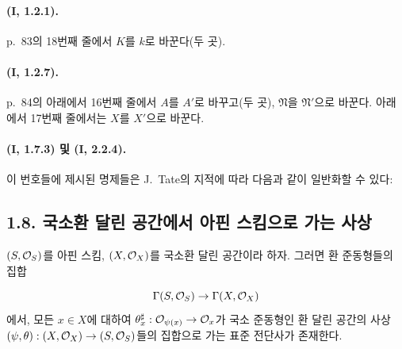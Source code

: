 \paragraph{(I, 1.2.1).}
p.~83의 18번째 줄에서 $K$를 $k$로 바꾼다(두 곳).

\paragraph{(I, 1.2.7).}
p.~84의 아래에서 16번째 줄에서 $A$를 $A'$로 바꾸고(두 곳),
$\mathfrak N$을 $\mathfrak N'$으로 바꾼다. 아래에서 17번째 줄에서는
$X$를 $X'$으로 바꾼다.

\paragraph{(I, 1.7.3) 및 (I, 2.2.4).}
이 번호들에 제시된 명제들은 J.~Tate의 지적에 따라 다음과 같이
일반화할 수 있다:
\subsection*{1.8. 국소환 달린 공간에서 아핀 스킴으로 가는 사상}
\label{ega2:addendum:subsection:I.1.8-ko}

\begin{proposition}[1.8.1]
\label{ega2:addendum:I.1.8.1-ko}
$(S,\mathcal{O}_S)$를 아핀 스킴, $(X,\mathcal{O}_X)$를 국소환 달린 공간이라 하자.
그러면 환 준동형들의 집합
\[
  \Gamma(S,\mathcal{O}_S)\to\Gamma(X,\mathcal{O}_X)
\]
에서, 모든 $x\in X$에 대하여
$\theta_x^\sharp:\mathcal{O}_{\psi(x)}\to\mathcal{O}_x$가 국소 준동형인 환 달린
공간의 사상
$(\psi,\theta):(X,\mathcal{O}_X)\to(S,\mathcal{O}_S)$들의 집합으로 가는 표준
전단사가 존재한다.
\end{proposition}

